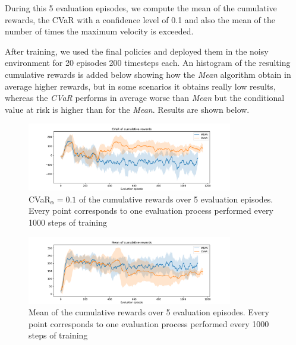 During this 5 evaluation episodes, we compute the mean of the cumulative rewards,
the CVaR with a confidence level of 0.1 and also the mean of the number of times the 
maximum velocity is exceeded. 

After training, we used the final policies and deployed them in the noisy environment for 20 episodes 
200 timesteps each. An histogram of the resulting cumulative rewards is added below showing
how the \textit{Mean} algorithm obtain in average higher rewards, but in some scenarios it 
obtains really low results, whereas the \textit{CVaR} performs in average worse than \textit{Mean} 
but the conditional value at risk is higher than for the \textit{Mean}.
Results are shown below.



\begin{figure}[ht]
        \centering
        \includegraphics[width=0.8\textwidth]{images/Cheetah_offpolicy_medium/cvar_train_withstds.pdf}
        \caption{CVaR$_\alpha=0.1$ of the cumulative rewards over 5 evaluation episodes.
        Every point corresponds to one evaluation process performed every 1000 steps of training}
        \label{cvar_cheetah}
    
\end{figure}

\begin{figure}[ht]
    \centering
    \includegraphics[width=0.8\textwidth]{images/Cheetah_offpolicy_medium/mean_train_withstds.pdf}
    \caption{Mean of the cumulative rewards over 5 evaluation episodes. Every point corresponds
    to one evaluation process performed every 1000 steps of training}
    \label{mean_cheetah}

\end{figure}



